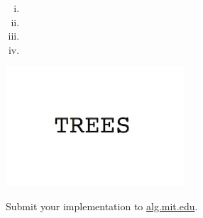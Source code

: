 \documentclass[12pt,twoside]{article}
\begin{document}
\begin{problems}
\begin{problemparts}
\problempart %
\begin{enumerate}[i.]
  \item %
  \item %
  \item %
  \item %
\end{enumerate}
\begin{center}
  \includegraphics[width=0.5\textwidth]{img.jpg}
\end{center}
\end{problemparts}

\newpage
\problem  %

\begin{problemparts}
\problempart %
\problempart %
\problempart %
\problempart Submit your implementation to {\small\url{alg.mit.edu}}.
\end{problemparts}

\end{problems}
\end{document}
